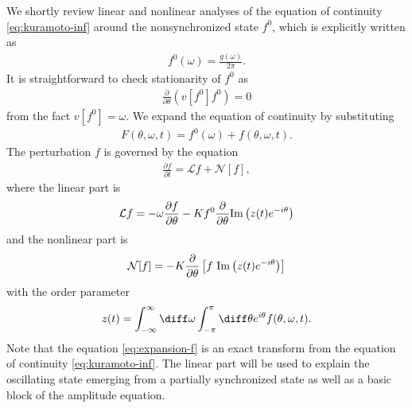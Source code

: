 We shortly review linear and nonlinear analyses
of the equation of continuity \eqref{eq:kuramoto-inf}
around the nonsynchronized state $f^{0}$, which is explicitly written as
\begin{align}
  f^{0}(\omega) = \frac{g(\omega)}{2\pi}.
\end{align}
It is straightforward to check stationarity of $f^{0}$ as
\begin{align}
  \frac{\partial}{\partial\theta}(v[f^{0}]f^{0}) = 0
\end{align}
from the fact $v[f^{0}] = \omega$.
We expand the equation of continuity by substituting
\begin{align}
  F(\theta,\omega,t) = f^{0}(\omega) + f(\theta,\omega,t). 
\end{align}
The perturbation $f$ is governed by the equation
\begin{align}
  \frac{\partial f}{\partial t}=\mathcal{L}f+\mathcal{N}[f],
  \label{eq:expansion-f}
\end{align}
where the linear part is
\begin{align}
  \label{eq:linear-L}
  \mathcal{L}f
  = - \omega \dfrac{\partial f}{\partial\theta}
  - K f^{0} \dfrac{\partial}{\partial\theta}
  {\rm Im} \left( z(t) e^{-i\theta} \right)
\end{align}
and the nonlinear part is
\begin{align}
  \label{eq:nonlinear-N}
  \mathcal{N}[f]
  = - K \dfrac{\partial}{\partial\theta} \left[
    f~ {\rm Im}\left( z(t) e^{-i\theta} \right) \right]
\end{align}
with the order parameter
\begin{align}
  z(t) = \int_{-\infty}^{\infty} \diff\omega \int_{-\pi}^{\pi} \diff\theta
  e^{i\theta} f(\theta,\omega,t).
\end{align}
Note that the equation \eqref{eq:expansion-f} is an exact transform
from the equation of continuity \eqref{eq:kuramoto-inf}.
The linear part will be used to explain the oscillating state
emerging from a partially synchronized state
as well as a basic block of the amplitude equation.



